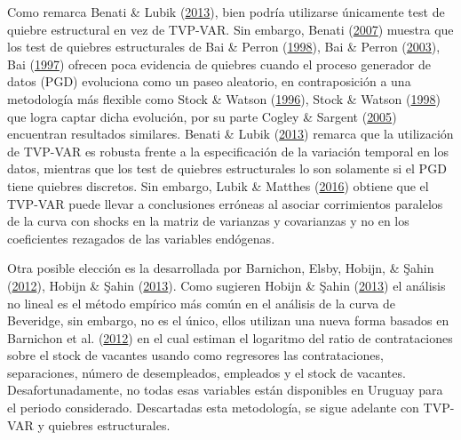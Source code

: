 \documentclass[12pt,oneside]{reedthesis}
\begin{document}
Como remarca Benati \& Lubik (\protect\hyperlink{ref-Benati2013}{2013}), bien podría utilizarse únicamente test de quiebre estructural en vez de TVP-VAR. Sin embargo, Benati (\protect\hyperlink{ref-Benati2007}{2007}) muestra que los test de quiebres estructurales de Bai \& Perron (\protect\hyperlink{ref-BaiPerron1998}{1998}), Bai \& Perron (\protect\hyperlink{ref-BaiPerron2003}{2003}), Bai (\protect\hyperlink{ref-Bai1997}{1997}) ofrecen poca evidencia de quiebres cuando el proceso generador de datos (PGD) evoluciona como un paseo aleatorio, en contraposición a una metodología más flexible como Stock \& Watson (\protect\hyperlink{ref-Stock1996}{1996}), Stock \& Watson (\protect\hyperlink{ref-Stock1998}{1998}) que logra captar dicha evolución, por su parte Cogley \& Sargent (\protect\hyperlink{ref-Cogley2005}{2005}) encuentran resultados similares. Benati \& Lubik (\protect\hyperlink{ref-Benati2013}{2013}) remarca que la utilización de TVP-VAR es robusta frente a la especificación de la variación temporal en los datos, mientras que los test de quiebres estructurales lo son solamente si el PGD tiene quiebres discretos. Sin embargo, Lubik \& Matthes (\protect\hyperlink{ref-Lubik2016}{2016}) obtiene que el TVP-VAR puede llevar a conclusiones erróneas al asociar corrimientos paralelos de la curva con shocks en la matriz de varianzas y covarianzas y no en los coeficientes rezagados de las variables endógenas.

Otra posible elección es la desarrollada por Barnichon, Elsby, Hobijn, \& Şahin (\protect\hyperlink{ref-Barnichon2012}{2012}), Hobijn \& Şahin (\protect\hyperlink{ref-Hobijn2013}{2013}). Como sugieren Hobijn \& Şahin (\protect\hyperlink{ref-Hobijn2013}{2013}) el análisis no lineal es el método empírico más común en el análisis de la curva de Beveridge, sin embargo, no es el único, ellos utilizan una nueva forma basados en Barnichon et al. (\protect\hyperlink{ref-Barnichon2012}{2012}) en el cual estiman el logaritmo del ratio de contrataciones sobre el stock de vacantes usando como regresores las contrataciones, separaciones, número de desempleados, empleados y el stock de vacantes. Desafortunadamente, no todas esas variables están disponibles en Uruguay para el periodo considerado. Descartadas esta metodología, se sigue adelante con TVP-VAR y quiebres estructurales.
\end{document}
